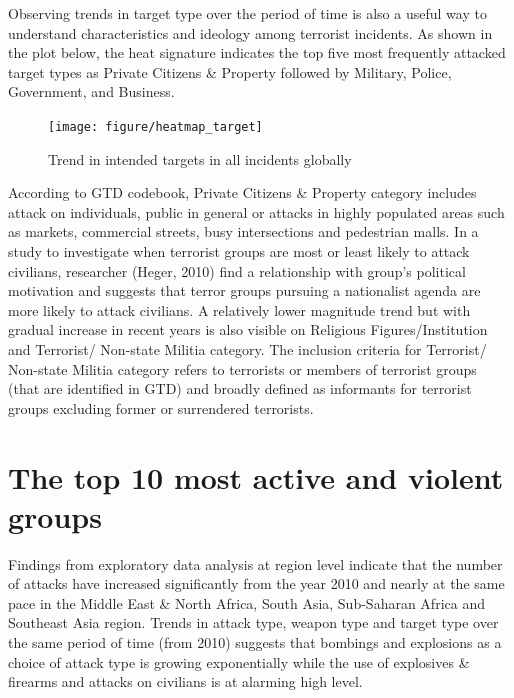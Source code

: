\documentclass[11pt,oneside,a4paper]{reedthesis}
\newenvironment{Shaded}{\begin{snugshade}}{\end{snugshade}}
\newcommand{\KeywordTok}[1]{\textcolor[rgb]{0.13,0.29,0.53}{\textbf{#1}}}
\newcommand{\DataTypeTok}[1]{\textcolor[rgb]{0.13,0.29,0.53}{#1}}
\newcommand{\StringTok}[1]{\textcolor[rgb]{0.31,0.60,0.02}{#1}}
\newcommand{\OperatorTok}[1]{\textcolor[rgb]{0.81,0.36,0.00}{\textbf{#1}}}
\newcommand{\NormalTok}[1]{#1}
\begin{document}
Observing trends in target type over the period of time is also a useful
way to understand characteristics and ideology among terrorist
incidents. As shown in the plot below, the heat signature indicates the
top five most frequently attacked target types as Private Citizens \&
Property followed by Military, Police, Government, and Business.
\begin{Shaded}
\end{Shaded}
\begin{figure}
\texttt{[image: figure/heatmap\_target]} \caption{Trend in intended targets in all incidents globally}\label{fig:unnamed-chunk-9}
\end{figure}
According to GTD codebook, Private Citizens \& Property category
includes attack on individuals, public in general or attacks in highly
populated areas such as markets, commercial streets, busy intersections
and pedestrian malls. In a study to investigate when terrorist groups
are most or least likely to attack civilians, researcher (Heger, 2010)
find a relationship with group's political motivation and suggests that
terror groups pursuing a nationalist agenda are more likely to attack
civilians. A relatively lower magnitude trend but with gradual increase
in recent years is also visible on Religious Figures/Institution and
Terrorist/ Non-state Militia category. The inclusion criteria for
Terrorist/ Non-state Militia category refers to terrorists or members of
terrorist groups (that are identified in GTD) and broadly defined as
informants for terrorist groups excluding former or surrendered
terrorists.

\section{The top 10 most active and violent
groups}\label{the-top-10-most-active-and-violent-groups}

Findings from exploratory data analysis at region level indicate that
the number of attacks have increased significantly from the year 2010
and nearly at the same pace in the Middle East \& North Africa, South
Asia, Sub-Saharan Africa and Southeast Asia region. Trends in attack
type, weapon type and target type over the same period of time (from
2010) suggests that bombings and explosions as a choice of attack type
is growing exponentially while the use of explosives \& firearms and
attacks on civilians is at alarming high level.
\end{document}
